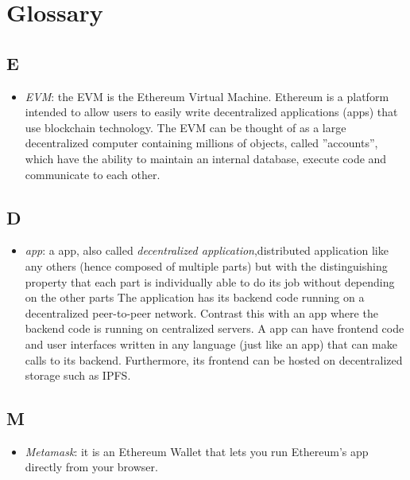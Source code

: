 \newpage
\section*{Glossary}

\subsection*{E}
\begin{itemize}
	\item \emph{EVM}: the EVM is the Ethereum Virtual Machine. Ethereum is a platform intended to allow users to easily write decentralized applications (\DH apps) that use blockchain technology. The EVM can be thought of as a large decentralized computer containing millions of objects, called ''accounts'', which have the   ability   to   maintain   an   internal   database,   execute   code   and   communicate   to   each   other.
\end{itemize}

\subsection*{D}
\begin{itemize}
	\item \emph{\DH app}: a \DH app, also called \emph{decentralized application},distributed application like any others (hence composed of multiple parts) but with the distinguishing property that each part is individually able to do its job without depending on the other parts The application has its backend code running on a decentralized peer-to-peer network. Contrast this with an app where the backend code is running on centralized servers. A \DH app can have frontend code and user interfaces written in any language (just like an app) that can make calls to its backend. Furthermore, its frontend can be hosted on decentralized storage such as IPFS. 
\end{itemize}

\subsection*{M}
\begin{itemize}
\item \emph{Metamask}: it is an Ethereum Wallet that lets you run Ethereum's \DH app directly from your browser.
\end{itemize}


